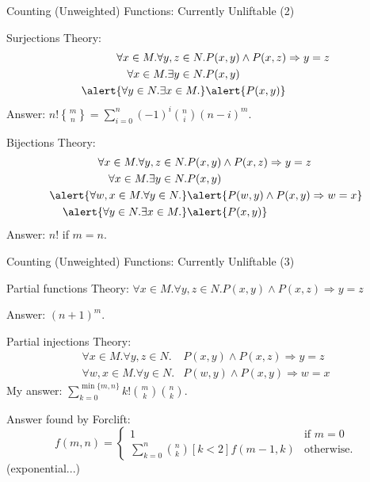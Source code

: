 \documentclass{beamer}
\DeclareRobustCommand{\stirling}{\genfrac\{\}{0pt}{}}
\begin{document}
\begin{frame}{Counting (Unweighted) Functions: Currently Unliftable (2)}
  \begin{block}{Surjections}
    Theory:
    \begin{align*}
      \forall x \in M. \forall y, z \in N. &P(x, y) \land P(x, z) \Rightarrow y=z \\
      \forall x \in M. \exists y \in N. &P(x, y) \\
      \alert{\forall y \in N. \exists x \in M.} &\alert{P(x, y)}
    \end{align*}
    Answer: $n!\stirling{m}{n} = \sum_{i=0}^n (-1)^i\binom{n}{i}(n-i)^m$.
  \end{block}
  \begin{block}{Bijections}
    Theory:
    \begin{align*}
      \forall x \in M. \forall y, z \in N. &P(x, y) \land P(x, z) \Rightarrow y=z \\
      \forall x \in M. \exists y \in N. &P(x, y) \\
      \alert{\forall w, x \in M. \forall y \in N.} &\alert{P(w, y) \land P(x, y) \Rightarrow w=x} \\
      \alert{\forall y \in N. \exists x \in M.} &\alert{P(x, y)}
    \end{align*}
    Answer: $n!$ if $m=n$.
  \end{block}
\end{frame}

\begin{frame}{Counting (Unweighted) Functions: Currently Unliftable (3)}
  \begin{block}{Partial functions}
    Theory: $\forall x \in M. \forall y, z \in N. P(x, y) \land P(x, z)
    \Rightarrow y=z$

    Answer: $(n+1)^m$.
  \end{block}
  \begin{block}{Partial injections}
    Theory:
    \begin{align*}
      \forall x \in M. \forall y, z \in N. &P(x, y) \land P(x, z) \Rightarrow y=z \\
      \forall w, x \in M. \forall y \in N. &P(w, y) \land P(x, y) \Rightarrow w=x
    \end{align*}
    My answer: $\sum_{k=0}^{\min\{m, n\}} k!\binom{m}{k}\binom{n}{k}$.

    \pause
    \alert{Answer found by Forclift:}
    \[
    f(m, n) =
    \begin{cases}
      1 & \text{if } m = 0 \\
      \sum_{k=0}^n \binom{n}{k} [k < 2] f(m-1, k) & \text{otherwise.}
    \end{cases}
    \]
    (exponential...)
  \end{block}
\end{frame}
\end{document}
